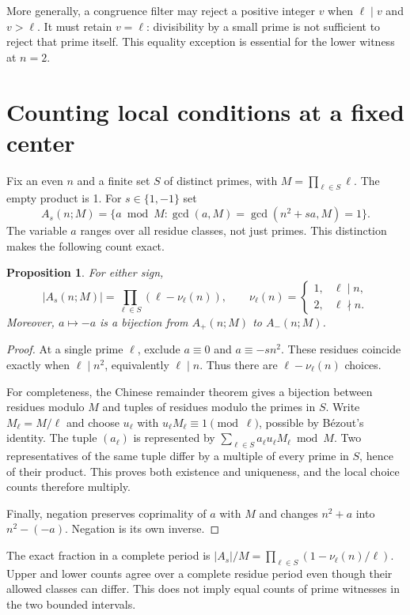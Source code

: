 \documentclass[11pt,a4paper]{article}
\newtheorem{proposition}{Proposition}
\begin{document}
More generally, a congruence filter may reject a positive integer $v$
when $\ell\mid v$ and $v>\ell$. It must retain $v=\ell$:
divisibility by a small prime is not sufficient to reject that prime itself.
This equality exception is essential for the lower witness at $n=2$.

\newpage
\section{Counting local conditions at a fixed center}
Fix an even $n$ and a finite set $S$ of distinct primes, with
$M=\prod_{\ell\in S}\ell$. The empty product is 1. For $s\in\{1,-1\}$ set
\[
A_s(n;M)=\{a\bmod M:\gcd(a,M)=\gcd(n^2+sa,M)=1\}.
\]
The variable $a$ ranges over all residue classes, not just primes.
This distinction makes the following count exact.

\begin{proposition}\label{prop:local}
For either sign,
\[
 |A_s(n;M)|=\prod_{\ell\in S}(\ell-\nu_\ell(n)),
 \qquad
 \nu_\ell(n)=
 \begin{cases}1,&\ell\mid n,\\2,&\ell\nmid n.\end{cases}
\]
Moreover, $a\mapsto-a$ is a bijection from $A_+(n;M)$ to $A_-(n;M)$.
\end{proposition}
\begin{proof}
At a single prime $\ell$, exclude $a\equiv0$ and $a\equiv-sn^2$.
These residues coincide exactly when $\ell\mid n^2$, equivalently
$\ell\mid n$. Thus there are $\ell-\nu_\ell(n)$ choices.

For completeness, the Chinese remainder theorem gives a bijection between
residues modulo $M$ and tuples of residues modulo the primes in $S$.
Write $M_\ell=M/\ell$ and choose $u_\ell$ with
$u_\ell M_\ell\equiv1\pmod\ell$, possible by B\'ezout's identity.
The tuple $(a_\ell)$ is represented by
$\sum_{\ell\in S}a_\ell u_\ell M_\ell\bmod M$.
Two representatives of the same tuple differ by a multiple of every prime
in $S$, hence of their product. This proves both existence and uniqueness,
and the local choice counts therefore multiply.

Finally, negation preserves coprimality of $a$ with $M$ and changes
$n^2+a$ into $n^2-(-a)$. Negation is its own inverse.
\end{proof}

The exact fraction in a complete period is
$|A_s|/M=\prod_{\ell\in S}(1-\nu_\ell(n)/\ell)$.
Upper and lower counts agree over a complete residue period even though
their allowed classes can differ. This does not imply equal counts of prime
witnesses in the two bounded intervals.
\end{document}
